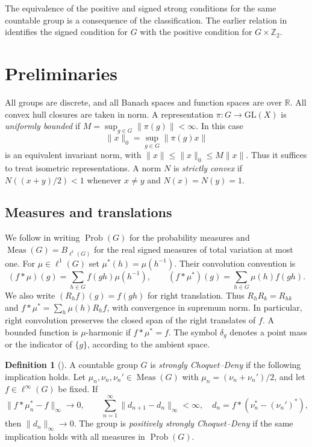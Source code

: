 \documentclass[11pt,letterpaper]{amsart}
\theoremstyle{definition}
\newtheorem{definition}[theorem]{Definition}
\theoremstyle{remark}
\newcommand{\R}{\mathbb R}
\newcommand{\Z}{\mathbb Z}
\DeclareMathOperator{\Prob}{Prob}
\DeclareMathOperator{\Meas}{Meas}
\begin{document}
The equivalence of the positive and signed strong conditions for the
same countable group is a consequence of the classification.
The earlier relation in \cite[Proposition~2.6]{DD} identifies the
signed condition for $G$ with the positive condition for
$G\times\Z_2$.

\section{Preliminaries}\label{sec:prelim}
All groups are discrete, and all Banach spaces and function spaces are
over $\R$. All convex hull closures are taken in norm. A representation
$\pi:G\to\mathrm{GL}(X)$ is \emph{uniformly bounded} if
$M=\sup_{g\in G}\|\pi(g)\|<\infty$. In this case
\[
 \|x\|_0=\sup_{g\in G}\|\pi(g)x\|
\]
is an equivalent invariant norm, with
$\|x\|\leq\|x\|_0\leq M\|x\|$. Thus it suffices to treat isometric
representations. A norm $N$ is \emph{strictly convex} if
$N((x+y)/2)<1$ whenever $x\ne y$ and $N(x)=N(y)=1$.

\subsection{Measures and translations}
We follow \cite[Section~2.2]{DD} in writing $\Prob(G)$ for the
probability measures and $\Meas(G)=B_{\ell^1(G)}$ for the real signed
measures of total variation at most one. For $\mu\in\ell^1(G)$ set
$\mu^*(h)=\mu(h^{-1})$. Their convolution convention is
\[
 (f*\mu)(g)=\sum_{h\in G}f(gh)\mu(h^{-1}),\qquad
 (f*\mu^*)(g)=\sum_{h\in G}\mu(h)f(gh).
\]
We also write $(R_hf)(g)=f(gh)$ for right translation. Thus
$R_hR_k=R_{hk}$ and $f*\mu^*=\sum_h\mu(h)R_hf$, with convergence
in supremum norm. In particular, right convolution preserves the
closed span of the right translates of $f$. A bounded function is
$\mu$-harmonic if $f*\mu^*=f$. The symbol $\delta_g$ denotes a point
mass or the indicator of $\{g\}$, according to the ambient space.

\begin{definition}[{\cite[Definition~2.4]{DD}}]\label{def:strong}
A countable group $G$ is \emph{strongly Choquet--Deny} if the following
implication holds. Let
$\mu_n,\nu_n,\nu_n'\in\Meas(G)$ with $\mu_n=(\nu_n+\nu_n')/2$,
and let $f\in\ell^\infty(G)$ be fixed. If
\begin{equation}\label{eq:hypotheses}
 \|f*\mu_n^*-f\|_\infty\longrightarrow0,
 \qquad
 \sum_{n=1}^\infty\|d_{n+1}-d_n\|_\infty<\infty,
 \quad d_n=f*(\nu_n^*-(\nu_n')^*),
\end{equation}
then $\|d_n\|_\infty\to0$. The group is \emph{positively strongly
Choquet--Deny} if the same implication holds with all measures in
$\Prob(G)$.
\end{definition}
\end{document}
